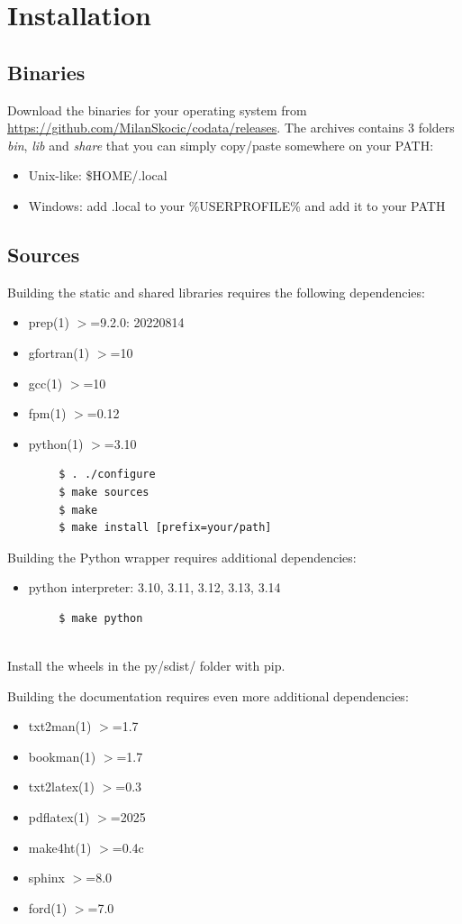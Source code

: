 \chapter{Installation}
\section{Binaries}
Download the binaries for your operating system from 
\url{https://github.com/MilanSkocic/codata/releases}.
The archives contains 3 folders \emph{bin}, \emph{lib} and \emph{share} that you can simply
copy/paste somewhere on your PATH:
\begin{itemize}
\item Unix-like: \$HOME/.local
\item Windows: add .local to your \%USERPROFILE\% and add it to your PATH
\end{itemize}


\section{Sources}
Building the static and shared libraries requires the following dependencies:
\begin{itemize}
\item prep(1) $>$=9.2.0: 20220814
\item gfortran(1) $>$=10
\item gcc(1) $>$=10
\item fpm(1) $>$=0.12
\item python(1) $>$=3.10
\end{itemize}
 
\begin{verbatim}
        $ . ./configure
        $ make sources
        $ make
        $ make install [prefix=your/path]

\end{verbatim}
Building the Python wrapper requires additional dependencies:
\begin{itemize}
\item python interpreter: 3.10, 3.11, 3.12, 3.13, 3.14
\end{itemize}

\begin{verbatim}
        $ make python
  
\end{verbatim}
Install the wheels in the py/sdist/ folder with pip.

Building the documentation requires even more additional dependencies:
\begin{itemize}
\item txt2man(1) $>$=1.7
\item bookman(1) $>$=1.7
\item txt2latex(1) $>$=0.3
\item pdflatex(1) $>$=2025
\item make4ht(1) $>$=0.4c
\item sphinx $>$=8.0
\item ford(1) $>$=7.0
\end{itemize}
